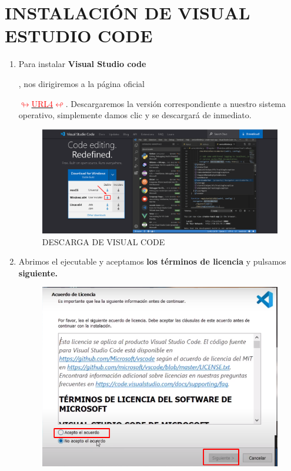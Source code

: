 \section{INSTALACIÓN DE VISUAL ESTUDIO CODE}
\begin{enumerate}
\item \hypertarget{instalarcode}{Para instalar \textbf{Visual Studio code}}, nos dirigiremos a la página oficial 
 \begin{minipage}[c]{0,17 \textwidth}
 \href{https://code.visualstudio.com/}{
 \def\svgwidth{0.9\textwidth}
 } 
 \end{minipage}\newline \hyperlink{code}{\textcolor{red}{$\looparrowright$URL4$\looparrowleft$}}.
 Descargaremos la versión correspondiente a nuestro sistema operativo, simplemente damos clic y se descargará de inmediato.
\begin{figure}[H]
    \centering
    \includegraphics[width = 16 cm]{img/parte1code.png}
    \caption{DESCARGA DE VISUAL CODE}
\end{figure}
\newpage
\item Abrimos el ejecutable y aceptamos \textbf{los términos de licencia} y pulsamos \textbf{siguiente. }
\begin{figure}[H]
    \centering
    \includegraphics[width = 10 cm]{img/parte2code.png}

\end{figure}
\end{enumerate}
